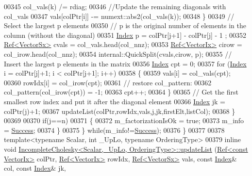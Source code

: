 \begin{DoxyCode}
00345         col\_vals(k) /= rdiag;
00346         \textcolor{comment}{//Update the remaining diagonals with col\_vals}
00347         vals[colPtr[i]] -= numext::abs2(col\_vals(k));
00348       \}
00349       \textcolor{comment}{// Select the largest p elements}
00350       \textcolor{comment}{// p is the original number of elements in the column (without the diagonal)}
00351       \hyperlink{namespace_eigen_a62e77e0933482dafde8fe197d9a2cfde}{Index} p = colPtr[j+1] - colPtr[j] - 1 ;
00352       \hyperlink{group___core___module_class_eigen_1_1_ref}{Ref<VectorSx>} cvals = col\_vals.head(col\_nnz);
00353       \hyperlink{group___core___module_class_eigen_1_1_ref}{Ref<VectorIx>} cirow = col\_irow.head(col\_nnz);
00354       internal::QuickSplit(cvals,cirow, p);
00355       \textcolor{comment}{// Insert the largest p elements in the matrix}
00356       \hyperlink{namespace_eigen_a62e77e0933482dafde8fe197d9a2cfde}{Index} cpt = 0;
00357       \textcolor{keywordflow}{for} (\hyperlink{namespace_eigen_a62e77e0933482dafde8fe197d9a2cfde}{Index} i = colPtr[j]+1; i < colPtr[j+1]; i++)
00358       \{
00359         vals[i] = col\_vals(cpt);
00360         rowIdx[i] = col\_irow(cpt);
00361         \textcolor{comment}{// restore col\_pattern:}
00362         col\_pattern(col\_irow(cpt)) = -1;
00363         cpt++;
00364       \}
00365       \textcolor{comment}{// Get the first smallest row index and put it after the diagonal element}
00366       \hyperlink{namespace_eigen_a62e77e0933482dafde8fe197d9a2cfde}{Index} jk = colPtr(j)+1;
00367       updateList(colPtr,rowIdx,vals,j,jk,firstElt,listCol);
00368     \}
00369 
00370     \textcolor{keywordflow}{if}(j==n)
00371     \{
00372       m\_factorizationIsOk = \textcolor{keyword}{true};
00373       m\_info = \hyperlink{group__enums_gga85fad7b87587764e5cf6b513a9e0ee5ea52581b035f4b59c203b8ff999ef5fcea}{Success};
00374     \}
00375   \} \textcolor{keywordflow}{while}(m\_info!=\hyperlink{group__enums_gga85fad7b87587764e5cf6b513a9e0ee5ea52581b035f4b59c203b8ff999ef5fcea}{Success});
00376 \}
00377 
00378 \textcolor{keyword}{template}<\textcolor{keyword}{typename} Scalar, \textcolor{keywordtype}{int} \_UpLo, \textcolor{keyword}{typename} OrderingType>
00379 \textcolor{keyword}{inline} \textcolor{keywordtype}{void} \hyperlink{class_eigen_1_1_incomplete_cholesky}{IncompleteCholesky<Scalar,\_UpLo, OrderingType>::updateList}
      (\hyperlink{group___core___module_class_eigen_1_1_ref}{Ref<const VectorIx>} colPtr, \hyperlink{group___core___module_class_eigen_1_1_ref}{Ref<VectorIx>} rowIdx, 
      \hyperlink{group___core___module_class_eigen_1_1_ref}{Ref<VectorSx>} vals, \textcolor{keyword}{const} \hyperlink{namespace_eigen_a62e77e0933482dafde8fe197d9a2cfde}{Index}& col, \textcolor{keyword}{const} \hyperlink{namespace_eigen_a62e77e0933482dafde8fe197d9a2cfde}{Index}& jk, 

\end{DoxyCode}
